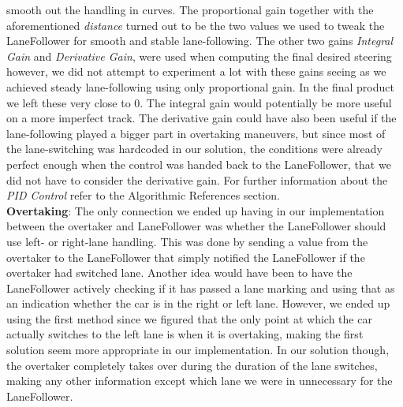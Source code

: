 smooth out the handling in curves. The proportional gain together with the
aforementioned \textit{distance} turned out to be the two values we used to
tweak the LaneFollower for smooth and stable lane-following. The other two gains
\textit{Integral Gain} and \textit{Derivative Gain}, were used when computing
the final desired steering however, we did not attempt to experiment a lot with
these gains seeing as we achieved steady lane-following using only proportional
gain. In the final product we left these very close to 0. The integral gain
would potentially be more useful on a more imperfect track. The derivative gain
could have also been useful if the lane-following played a bigger part in
overtaking maneuvers, but since most of the lane-switching was hardcoded in our
solution, the conditions were already perfect enough when the control was handed
back to the LaneFollower, that we did not have to consider the derivative gain.
For further information about the \textit{PID Control} refer to the Algorithmic
References section.\\

\noindent
\textbf{Overtaking}: The only connection we ended up having in our
implementation between the overtaker and LaneFollower was whether the
LaneFollower should use left- or right-lane handling. This was done by sending a
value from the overtaker to the LaneFollower that simply notified the
LaneFollower if the overtaker had switched lane. Another idea would have been to
have the LaneFollower actively checking if it has passed a lane marking and
using that as an indication whether the car is in the right or left lane.
However, we ended up using the first method since we figured that the only point
at which the car actually switches to the left lane is when it is overtaking,
making the first solution seem more appropriate in our implementation. In our
solution though, the overtaker completely takes over during the duration of the
lane switches, making any other information except which lane we were in
unnecessary for the LaneFollower.\\

